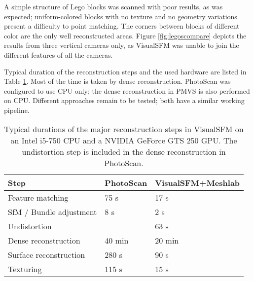 
A simple structure of Lego blocks was scanned with poor results, as was expected; uniform-colored blocks with no texture and no geometry variations present a difficulty to point matching.
The corners between blocks of different color are the only well reconstructed areas.
Figure \ref{fig:legoscompare} depicts the results from three vertical cameras only, as VisualSFM was unable to join the different features of all the cameras.


Typical duration of the reconstruction steps and the used hardware are listed in Table \ref{tab:reconsttime}.
Most of the time is taken by dense reconstruction.
PhotoScan was configured to use CPU only; the dense reconstruction in PMVS is also performed on CPU.
Different approaches remain to be tested; both have a similar working pipeline.

\begin{table}[t]
	\centering
	\begin{tabular}{l l l}
		Step & PhotoScan & VisualSFM+Meshlab \\ \hline
		Feature matching & 75 s & 17 s \\
		SfM / Bundle adjustment & 8 s & 2 s\\
		Undistortion & & 63 s\\
		Dense reconstruction & 40 min & 20 min\\
		Surface reconstruction & 280 s & 90 s\\
		Texturing & 115 s & 15 s\\
	\end{tabular}
	\caption{
		Typical durations of the major reconstruction steps in VisualSFM on an Intel i5-750 CPU and a NVIDIA GeForce GTS 250 GPU.
		The undistortion step is included in the dense reconstruction in PhotoScan.
	}
	\label{tab:reconsttime}
\end{table}

